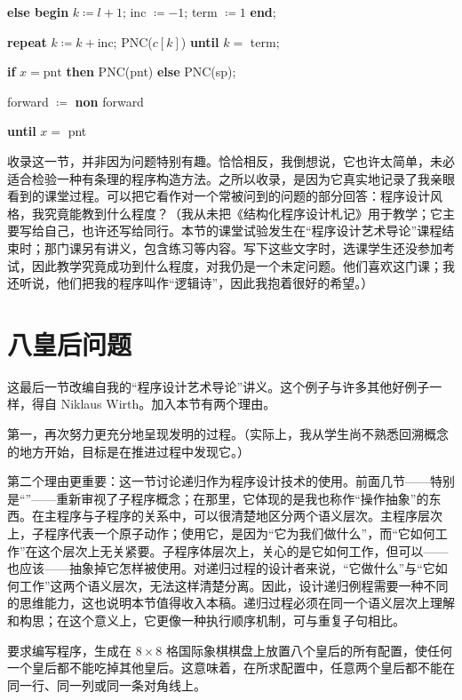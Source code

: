 \documentclass[twoside,11pt,fontset=none]{ctexbook}
\begin{document}
\quad \quad\quad \textbf{else begin} $k\coloneq l + 1$; inc $\coloneq -1$; term $\coloneq 1$ \textbf{end};

\quad \quad \textbf{repeat} $k\coloneq k + \text{inc}$; PNC($c[k]$) \textbf{until} $k =$ term;

\quad \quad \textbf{if} $x = \text{pnt}$ \textbf{then} PNC(pnt) \textbf{else} PNC(sp);

\quad \quad forward $\coloneq$ \textbf{non} forward

\quad \textbf{until} $x =$ pnt

收录这一节，并非因为问题特别有趣。恰恰相反，我倒想说，它也许太简单，未必适合检验一种有条理的程序构造方法。之所以收录，是因为它真实地记录了我亲眼看到的课堂过程。可以把它看作对一个常被问到的问题的部分回答：程序设计风格，我究竟能教到什么程度？（我从未把《结构化程序设计札记》用于教学；它主要写给自己，也许还写给同行。本节的课堂试验发生在“程序设计艺术导论”课程结束时；那门课另有讲义，包含练习等内容。写下这些文字时，选课学生还没参加考试，因此教学究竟成功到什么程度，对我仍是一个未定问题。他们喜欢这门课；我还听说，他们把我的程序叫作“逻辑诗”，因此我抱着很好的希望。）

\section[八皇后问题]{八皇后问题}

这最后一节改编自我的“程序设计艺术导论”讲义。这个例子与许多其他好例子一样，得自 Niklaus Wirth。加入本节有两个理由。

第一，再次努力更充分地呈现发明的过程。（实际上，我从学生尚不熟悉回溯概念的地方开始，目标是在推进过程中发现它。）

第二个理由更重要：这一节讨论递归作为程序设计技术的使用。前面几节——特别是“”——重新审视了子程序概念；在那里，它体现的是我也称作“操作抽象”的东西。在主程序与子程序的关系中，可以很清楚地区分两个语义层次。主程序层次上，子程序代表一个原子动作；使用它，是因为“它为我们做什么”，而“它如何工作”在这个层次上无关紧要。子程序体层次上，关心的是它如何工作，但可以——也应该——抽象掉它怎样被使用。对递归过程的设计者来说，“它做什么”与“它如何工作”这两个语义层次，无法这样清楚分离。因此，设计递归例程需要一种不同的思维能力，这也说明本节值得收入本稿。递归过程必须在同一个语义层次上理解和构思；在这个意义上，它更像一种执行顺序机制，可与重复子句相比。

要求编写程序，生成在 $8\times 8$ 格国际象棋棋盘上放置八个皇后的所有配置，使任何一个皇后都不能吃掉其他皇后。这意味着，在所求配置中，任意两个皇后都不能在同一行、同一列或同一条对角线上。
\end{document}
